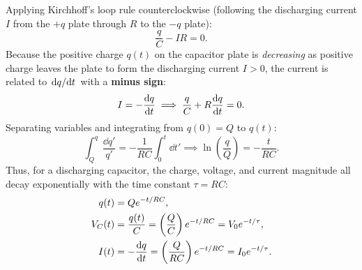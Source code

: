 Applying Kirchhoff's loop rule counterclockwise (following the discharging current $I$ from the $+q$ plate through $R$ to the $-q$ plate):
\begin{equation}
    \frac{q}{C} - I R = 0.
\end{equation}
Because the positive charge $q(t)$ on the capacitor plate is \emph{decreasing} as positive charge leaves the plate to form the discharging current $I > 0$, the current is related to $\dv*{q}{t}$ with a \textbf{minus sign}:
\begin{equation}
    I = -\dv{q}{t} \implies \frac{q}{C} + R \dv{q}{t} = 0.
\end{equation}
Separating variables and integrating from $q(0) = Q$ to $q(t)$:
\begin{equation}
    \int_Q^q \frac{\dd{q'}}{q'} = -\frac{1}{R C} \int_0^t \dd{t'} \implies \ln\left(\frac{q}{Q}\right) = -\frac{t}{R C}.
\end{equation}
Thus, for a discharging capacitor, the charge, voltage, and current magnitude all decay exponentially with the time constant $\tau = R C$:
\begin{align}
    q(t) &= Q e^{-t / RC}, \\
    V_C(t) &= \frac{q(t)}{C} = \left(\frac{Q}{C}\right) e^{-t / RC} = V_0 e^{-t / \tau}, \\
    I(t) &= -\dv{q}{t} = \left(\frac{Q}{R C}\right) e^{-t / RC} = I_0 e^{-t / \tau}.
\end{align}

\begin{center}
\end{center}


